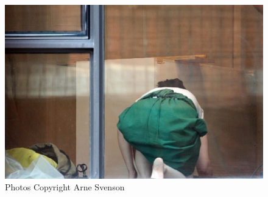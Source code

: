 \documentclass{beamer}
\begin{document}
\begin{frame}
\begin{columns}[c]
    \begin{figure}
    \includegraphics[width=\textwidth,height=0.8\textheight,keepaspectratio]{img/4_website_IMG_3013.jpg}
    \caption{Photos Copyright Arne Svenson}
    \end{figure}

    \end{columns}


\end{frame}
\end{document}
